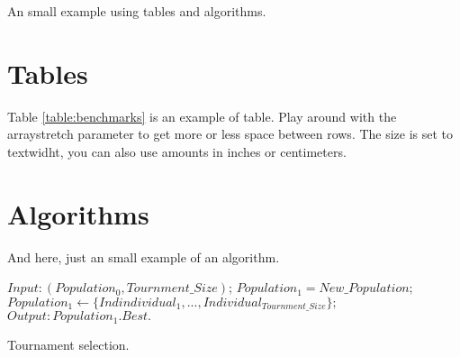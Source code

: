 An small example using tables and algorithms.
\section{Tables}

Table \ref{table:benchmarks} is an example of table. Play around with the arraystretch parameter to get more or less space between rows. The size is set to textwidht, you can also use amounts in inches or centimeters.

\begin{table}[ht]
\renewcommand{\arraystretch}{1.1}
\centering
{}
\caption{List of benchmark networks.}
\label{table:benchmarks}
\end{table}

\section{Algorithms}
And here, just an small example of an algorithm.

\begin{algorithm}[H]
\label{tourment-algorithm}
\SetAlgoLined
\DontPrintSemicolon %
$Input: (Population_0, Tournment\_Size)$;\;
$Population_1 = New\_Population;$\;
$Population_1 \leftarrow \{Indindividual_1,...,Individual_{Tournment\_Size}\};$\;
$Output : Population_1.Best.$\;
\caption{Tournament selection.}
\end{algorithm}

